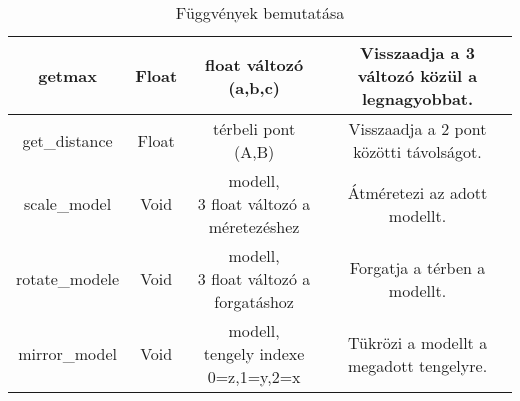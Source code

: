 \begin{table}[h]
\begin{tabular}{|c|c|c|c|}
		getmax&Float&\parbox{2.7cm}{ float változó\\(a,b,c)}&\parbox[c][1.5cm][c]{4.3cm}{\centering Visszaadja a 3 változó közül a legnagyobbat.}\\ \hline
		
		get\_distance&Float&\parbox{2.7cm}{ térbeli pont\\(A,B)}&\parbox[c][1.5cm][c]{4.3cm}{\centering Visszaadja a 2 pont közötti távolságot.}\\ \hline	
			
		scale\_model&Void&\parbox{2.7cm}{\centering modell,\\3 float változó a méretezéshez}&\parbox[c][1.7cm][c]{4.3cm}{\centering Átméretezi az adott modellt.}\\ \hline	
			
		rotate\_modele&Void&\parbox{2.7cm}{\centering modell,\\3 float változó a forgatáshoz}&\parbox[c][1.7cm][c]{4.3cm}{\centering Forgatja a térben a modellt.}\\ \hline		
		
		mirror\_model&Void&\parbox{2.7cm}{\centering modell,\\tengely indexe\\0=z,1=y,2=x}&\parbox[c][1.7cm][c]{4.3cm}{\centering Tükrözi a modellt a megadott tengelyre.}\\ \hline
		
	\end{tabular}
	\caption{Függvények bemutatása}
	\label{tab:fug}
\end{table}
